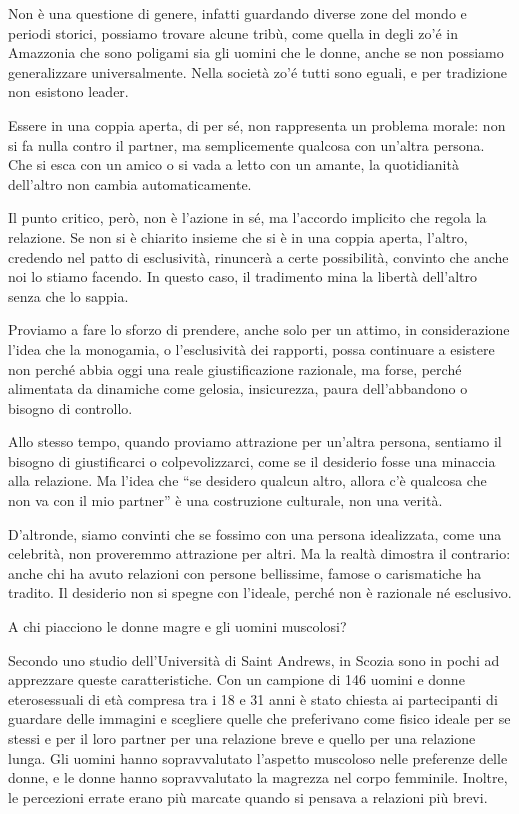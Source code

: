\documentclass[12pt]{book} %
\begin{document}
Non è una questione di genere, infatti guardando diverse zone del mondo e periodi storici, possiamo trovare alcune
tribù, come quella in degli zo'é in Amazzonia che sono poligami sia gli uomini che le donne, anche se non possiamo generalizzare universalmente. Nella
società zo'é tutti sono eguali, e per tradizione non esistono leader.

Essere in una coppia aperta, di per sé, non rappresenta un problema morale: non si fa nulla contro il partner, ma semplicemente qualcosa con un’altra persona. Che si esca con un amico o si vada a letto con un amante, la quotidianità dell’altro non cambia automaticamente.

Il punto critico, però, non è l’azione in sé, ma l’accordo implicito che regola la relazione. Se non si è chiarito insieme che si è in una coppia aperta, l'altro, credendo nel patto di esclusività, rinuncerà a certe possibilità, convinto che anche noi lo stiamo facendo. In questo caso, il tradimento mina la libertà dell’altro senza che lo sappia.

Proviamo a fare lo sforzo di prendere, anche solo per un attimo, in considerazione l’idea che la monogamia, o l’esclusività dei rapporti, possa continuare a esistere non perché abbia oggi una reale giustificazione razionale, ma forse, perché alimentata da dinamiche come gelosia, insicurezza, paura dell’abbandono o bisogno di controllo.

Allo stesso tempo, quando proviamo attrazione per un’altra persona, sentiamo il bisogno di giustificarci o colpevolizzarci, come se il desiderio fosse una minaccia alla relazione. Ma l’idea che “se desidero qualcun altro, allora c’è qualcosa che non va con il mio partner” è una costruzione culturale, non una verità.

D’altronde, siamo convinti che se fossimo con una persona idealizzata, come una celebrità, non proveremmo attrazione per altri. Ma la realtà dimostra il contrario: anche chi ha avuto relazioni con persone bellissime, famose o carismatiche ha tradito. Il desiderio non si spegne con l’ideale, perché non è razionale né esclusivo.

\begin{mdframed}[linewidth=1pt]
A chi piacciono le donne magre e gli uomini muscolosi?

Secondo uno studio dell'Università di Saint Andrews, in Scozia sono in pochi ad apprezzare queste caratteristiche. Con
un campione di 146 uomini e donne eterosessuali di età compresa tra i 18 e 31 anni è stato chiesta ai partecipanti di
guardare delle immagini e scegliere quelle che preferivano come fisico ideale per se stessi e per il loro partner per
una relazione breve e quello per una relazione lunga. Gli uomini hanno sopravvalutato l'aspetto muscoloso nelle
preferenze delle donne, e le donne hanno sopravvalutato la magrezza nel corpo femminile. Inoltre, le percezioni errate
erano più marcate quando si pensava a relazioni più brevi.
\end{mdframed}
\end{document}
